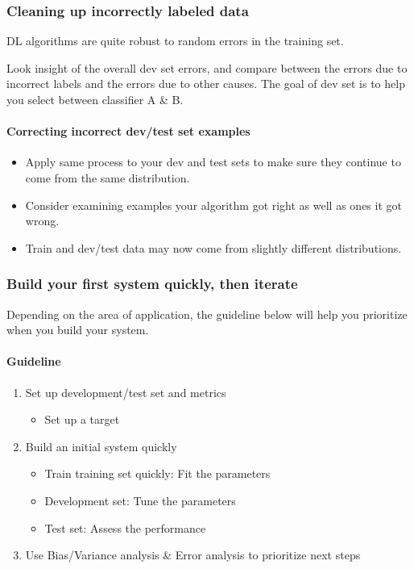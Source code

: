 \documentclass[UTF8]{article}
\begin{document}
\subsubsection{Cleaning up incorrectly labeled data}
DL algorithms are quite robust to random errors in the training set.

Look insight of the overall dev set errors, and compare between the errors due to incorrect labels
and the errors due to other causes. The goal of dev set is to help you select between classifier A
\& B.

\paragraph{Correcting incorrect dev/test set examples}
\begin{itemize}
    \item Apply same process to your dev and test sets to make sure they continue to come from the
    same distribution.
    \item Consider examining examples your algorithm got right as well as ones it got wrong.
    \item Train and dev/test data may now come from slightly different distributions.
\end{itemize}

\subsubsection{Build your first system quickly, then iterate}
Depending on the area of application, the guideline below will help you prioritize when you build
your system.

\paragraph{Guideline}
\begin{enumerate}
    \item Set up development/test set and metrics
    \begin{itemize}
        \item Set up a target
    \end{itemize}
    \item Build an initial system quickly
    \begin{itemize}
        \item Train training set quickly: Fit the parameters
        \item Development set: Tune the parameters
        \item Test set: Assess the performance
    \end{itemize}
    \item Use Bias/Variance analysis \& Error analysis to prioritize next steps
\end{enumerate}
\end{document}
